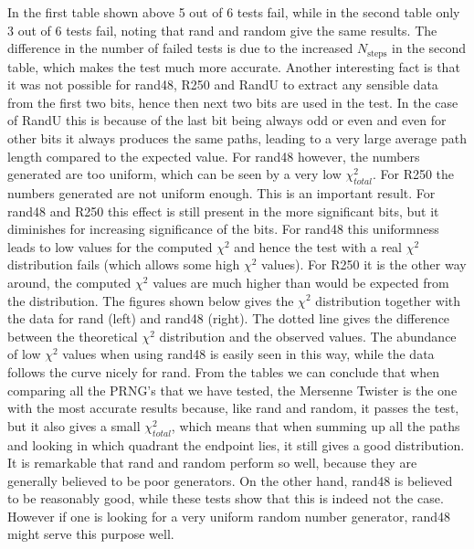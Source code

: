 \documentclass[10pt,a4paper]{article}
\begin{document}
\noindent In the first table shown above 5 out of 6 tests fail, while in the second table only 3 out of 6 tests fail, noting that rand and random give the same results. The difference in the number of failed tests is due to the increased $N_{\text{steps}}$ in the second table, which makes the test much more accurate. Another interesting fact is that it was not possible for rand48, R250 and RandU to extract any sensible data from the first two bits, hence then next two bits are used in the test. In the case of RandU this is because of the last bit being always odd or even and even for other bits it always produces the same paths, leading to a very large average path length compared to the expected value. For rand48 however, the numbers generated are too uniform, which can be seen by a very low $\chi^2_{total}$. For R250 the numbers generated are not uniform enough. This is an important result. For rand48 and R250 this effect is still present in the more significant bits, but it diminishes for increasing significance of the bits. For rand48 this uniformness leads to low values for the computed $\chi^2$ and hence the test with a real $\chi^2$ distribution fails (which allows some high $\chi^2$ values). For R250 it is the other way around, the computed $\chi^2$ values are much higher than would be expected from the distribution. The figures shown below gives the $\chi^2$ distribution together with the data for rand (left) and rand48 (right). The dotted line gives the difference between the theoretical $\chi^2$ distribution and the observed values. The abundance of low $\chi^2$ values when using rand48 is easily seen in this way, while the data follows the curve nicely for rand.
\newline
\noindent From the tables we can conclude that when comparing all the PRNG's that we have tested, the Mersenne Twister is the one with the most accurate results because, like rand and random, it passes the test, but it also gives a small $\chi^2_{total}$, which means that when summing up all the paths and looking in which quadrant the endpoint lies, it still gives a good distribution. It is remarkable that rand and random perform so well, because they are generally believed to be poor generators. On the other hand, rand48 is believed to be reasonably good, while these tests show that this is indeed not the case. However if one is looking for a very uniform random number generator, rand48 might serve this purpose well.
\end{document}
